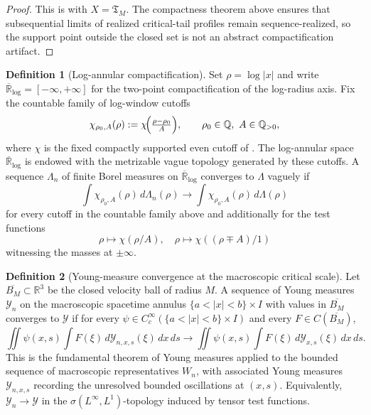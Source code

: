 \documentclass[11pt]{amsart}
\numberwithin{equation}{section}
\theoremstyle{plain}
\theoremstyle{definition}
\newtheorem{definition}[definition]{Definition}
\theoremstyle{remark}
\newcommand{\Tcrit}{\mathfrak T_M}
\begin{document}
\begin{proof}
This is  with \(X=\Tcrit\).  The
compactness theorem above ensures that subsequential limits of realized
critical-tail profiles remain sequence-realized, so the support point outside
the closed set is not an abstract compactification artifact.
\end{proof}

\begin{definition}[Log-annular compactification]
\label{def:log-annular-compactification}
Set \(\rho=\log|x|\) and write \(\overline{\mathbb R}_{\log}=[-\infty,+\infty]\)
for the two-point compactification of the log-radius axis.  Fix the countable
family of log-window cutoffs
\[
   \chi_{\rho_0,A}(\rho):=\chi\!\Bigl(\tfrac{\rho-\rho_0}{A}\Bigr),
   \qquad \rho_0\in\mathbb Q,\ A\in\mathbb Q_{>0},
\]
where \(\chi\) is the fixed compactly supported even cutoff of
.  The log-annular space
\(\overline{\mathbb R}_{\log}\) is endowed with the metrizable vague topology
generated by these cutoffs.  A sequence \(\Lambda_n\) of finite Borel measures
on \(\overline{\mathbb R}_{\log}\) converges to \(\Lambda\) vaguely if
\[
   \int \chi_{\rho_0,A}(\rho)\,d\Lambda_n(\rho)
   \longrightarrow
   \int \chi_{\rho_0,A}(\rho)\,d\Lambda(\rho)
\]
for every cutoff in the countable family above and additionally for the test
functions
\[
   \rho\mapsto \chi(\rho/A),\quad
   \rho\mapsto \chi((\rho\mp A)/1)
\]
witnessing the masses at \(\pm\infty\).
\end{definition}

\begin{definition}[Young-measure convergence at the macroscopic critical scale]
\label{def:young-measure-convergence}
Let \(\overline{B_M}\subset\mathbb R^3\) be the closed velocity ball of radius
\(M\).  A sequence of Young measures \(\mathcal Y_n\) on the macroscopic
spacetime annulus \(\{a<|x|<b\}\times I\) with values in \(\overline{B_M}\)
converges to \(\mathcal Y\) if for every \(\psi\in C_c^\infty(\{a<|x|<b\}\times
I)\) and every \(F\in C(\overline{B_M})\),
\[
   \iint \psi(x,s)\!\int F(\xi)\,d\mathcal Y_{n,x,s}(\xi)\,dx\,ds
   \longrightarrow
   \iint \psi(x,s)\!\int F(\xi)\,d\mathcal Y_{x,s}(\xi)\,dx\,ds .
\]
This is the fundamental theorem of Young measures applied to the bounded
sequence of macroscopic representatives \(W_n\), with associated Young
measures \(\mathcal Y_{n,x,s}\) recording the unresolved bounded oscillations
at \((x,s)\).  Equivalently, \(\mathcal Y_n\to\mathcal Y\) in the
\(\sigma(L^\infty,L^1)\)-topology induced by tensor test functions.
\end{definition}
\end{document}

